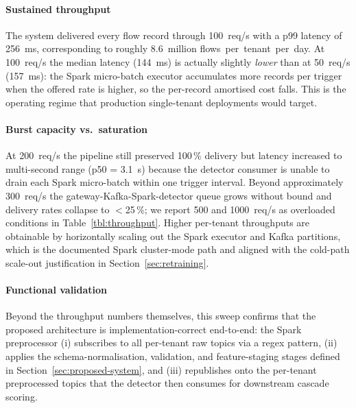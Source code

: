 \paragraph{Sustained throughput} The system delivered every flow
record through 100~req/s with a p99 latency of 256~ms, corresponding
to roughly $8.6$~million flows~per~tenant~per~day. At 100~req/s the
median latency (144~ms) is actually slightly \emph{lower} than at
50~req/s (157~ms): the Spark micro-batch executor accumulates more
records per trigger when the offered rate is higher, so the
per-record amortised cost falls. This is the operating regime that
production single-tenant deployments would target.

\paragraph{Burst capacity vs.\ saturation} At 200~req/s the pipeline
still preserved 100\,\% delivery but latency increased to multi-second
range (p50 = 3.1~s) because the detector consumer is unable to drain
each Spark micro-batch within one trigger interval. Beyond
approximately 300~req/s the gateway-Kafka-Spark-detector queue grows
without bound and delivery rates collapse to $<$25\,\%; we report
500 and 1000~req/s as overloaded conditions in
Table~\ref{tbl:throughput}. Higher per-tenant throughputs are
obtainable by horizontally scaling out the Spark executor and
Kafka partitions, which is the documented Spark cluster-mode path
and aligned with the cold-path scale-out justification in
Section~\ref{sec:retraining}.

\paragraph{Functional validation} Beyond the throughput numbers
themselves, this sweep confirms that the proposed architecture is
implementation-correct end-to-end: the Spark preprocessor (i)
subscribes to all per-tenant raw topics via a regex pattern,
(ii) applies the schema-normalisation, validation, and
feature-staging stages defined in Section~\ref{sec:proposed-system},
and (iii) republishes onto the per-tenant preprocessed topics that
the detector then consumes for downstream cascade scoring.

